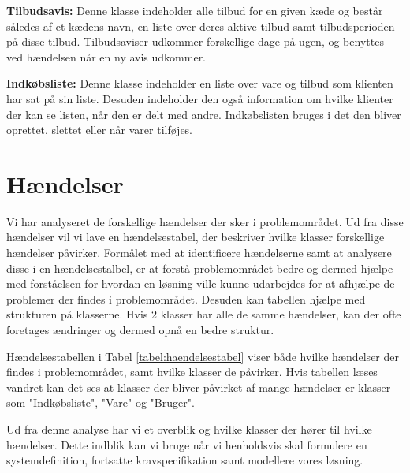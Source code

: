\textbf{Tilbudsavis:}
Denne klasse indeholder alle tilbud for en given kæde og består således af et kædens navn, en liste over deres aktive tilbud samt tilbudsperioden på disse tilbud. Tilbudsaviser udkommer forskellige dage på ugen, og benyttes ved hændelsen når en ny avis udkommer.

\textbf{Indkøbsliste:}
Denne klasse indeholder en liste over vare og tilbud som klienten har sat på sin liste. Desuden indeholder den også information om hvilke klienter der kan se listen, når den er delt med andre. Indkøbslisten bruges i det den bliver oprettet, slettet eller når varer tilføjes.


\section{Hændelser}
Vi har analyseret de forskellige hændelser der sker i problemområdet.   
Ud fra disse hændelser vil vi lave en hændelsestabel, der beskriver hvilke klasser forskellige hændelser påvirker.
Formålet med at identificere hændelserne samt at analysere disse i en hændelsestalbel, er at forstå problemområdet bedre og dermed hjælpe med forståelsen for hvordan en løsning ville kunne udarbejdes for at afhjælpe de problemer der findes i problemområdet. Desuden kan tabellen hjælpe med strukturen på klasserne. 
Hvis 2 klasser har alle de samme hændelser, kan der ofte foretages ændringer og dermed opnå en bedre struktur.



Hændelsestabellen i Tabel \ref{tabel:haendelsestabel} viser både hvilke hændelser der findes i problemområdet, samt hvilke klasser de påvirker.
Hvis tabellen læses vandret kan det ses at klasser der bliver påvirket af mange hændelser er klasser som "Indkøbsliste", "Vare" og "Bruger".


Ud fra denne analyse har vi et overblik og hvilke klasser der hører til hvilke hændelser.
Dette indblik kan vi bruge når vi henholdsvis skal formulere en systemdefinition, fortsatte kravspecifikation samt modellere vores løsning. 